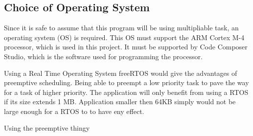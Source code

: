 \subsection{Choice of Operating System}
\label{sec:ChoiceofOperatingSystem}

Since it is safe to assume that this program will be using multipliable task, an operating system (OS) is required. This OS must support the ARM Cortex M-4 processor, which is used in this project. It must be supported by Code Composer Studio, which is the software used for programming the processor. 

Using a Real Time Operating System freeRTOS would give the advantages of preemptive scheduling. Being able to preempt a low priority task to pave the way for a task of higher priority. The application will only benefit from using a RTOS if its size extends 1 MB. Application smaller then 64KB simply would not be large enough for a RTOS to to have eny effect. 

Using the preemptive thingy


 